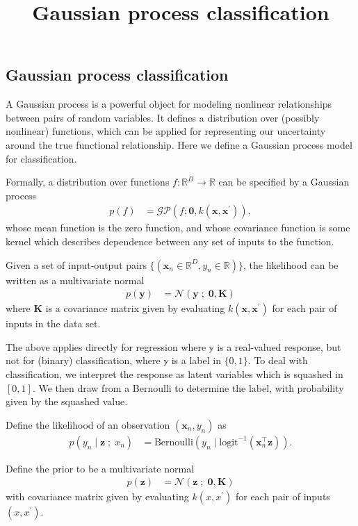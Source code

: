 \title{Gaussian process classification}

\subsection{Gaussian process classification}

A Gaussian process is a powerful object for modeling nonlinear
relationships between pairs of random variables. It defines a distribution over
(possibly nonlinear) functions, which can be applied for representing
our uncertainty around the true functional relationship.
Here we define a Gaussian process model for classification.

Formally, a distribution over functions $f:\mathbb{R}^D\to\mathbb{R}$ can be specified
by a Gaussian process
\begin{align*}
  p(f)
  &=
  \mathcal{GP}(f; \mathbf{0}, k(\mathbf{x}, \mathbf{x}^\prime)),
\end{align*}
whose mean function is the zero function, and whose covariance
function is some kernel which describes dependence between
any set of inputs to the function.

Given a set of input-output pairs
$\{(\mathbf{x}_n\in\mathbb{R}^D,y_n\in\mathbb{R})\}$,
the likelihood can be written as a multivariate normal
\begin{align*}
  p(\mathbf{y})
  &=
  \mathcal{N}(\mathbf{y} \;;\; \mathbf{0}, \mathbf{K})
\end{align*}
where $\mathbf{K}$ is a covariance matrix given by evaluating
$k(\mathbf{x}, \mathbf{x}^\prime)$ for each pair of inputs in the data
set.

The above applies directly for regression where $\mathbb{y}$ is a
real-valued response, but not for (binary) classification, where $\mathbb{y}$
is a label in $\{0,1\}$. To deal with classification, we interpret the
response as latent variables which is squashed in $[0,1]$. We then
draw from a Bernoulli to determine the label, with probability given
by the squashed value.

Define the likelihood of an observation $(\mathbf{x}_n, y_n)$ as
\begin{align*}
  p(y_n \mid \mathbf{z} \;;\; x_n)
  &=
  \text{Bernoulli}(y_n \mid \text{logit}^{-1}(\mathbf{x}_n^\top \mathbf{z})).
\end{align*}

Define the prior to be a multivariate normal
\begin{align*}
  p(\mathbf{z})
  &=
  \mathcal{N}(\mathbf{z} \;;\; \mathbf{0}, \mathbf{K})
\end{align*}
with
covariance matrix given by evaluating $k(x, x^\prime)$ for each pair of inputs
$(x, x^\prime)$.

